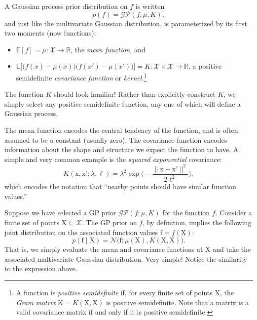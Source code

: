 \documentclass{article}
\newcommand{\given}{\mid}
\newcommand{\mc}[1]{\mathcal{#1}}
\newcommand{\mat}[1]{\bm{\mathrm{#1}}}
\renewcommand{\vec}[1]{\bm{\mathrm{#1}}}
\newcommand{\R}{\mathbb{R}}
\newcommand{\Exp}{\mathbb{E}}
\begin{document}
A Gaussian process prior distribution on $f$ is written
\begin{equation*}
  p(f) = \mc{GP}(f; \mu, K),
\end{equation*}
and just like the multivariate Gaussian distribution, is
parameterized by its first two moments (now functions):
\begin{itemize}
\item $\Exp[f] = \mu\colon \mc{X} \to \R$, the \emph{mean function,} and
\item $\Exp\bigl[\bigl(f(x) - \mu(x)\bigr)\bigl(f(x') -
  \mu(x')\bigr)\bigr] = K\colon \mc{X} \times \mc{X} \to \R$, a
  positive semidefinite \emph{covariance function} or
  \emph{kernel.}\footnote{A function is \emph{positive semidefinite}
    if, for every finite set of points $\mat{X}$, the \emph{Gram
      matrix} $\mat{K} = K(\mat{X}, \mat{X})$ is positive
    semidefinite.  Note that a matrix is a valid covariance matrix if
    and only if it is positive semidefinite.}
\end{itemize}
The function $K$ should look familiar!  Rather than explicitly
construct $K$, we simply select any positive semidefinite function,
any one of which will define a Gaussian process.

The mean function encodes the central tendency of the function, and is
often assumed to be a constant (usually zero).  The covariance
function encodes information about the shape and structure we expect
the function to have.  A simple and very common example is the
\emph{squared exponential} covariance:
\begin{equation*}
  K(\vec{x}, \vec{x}'; \lambda, \ell)
  =
  \lambda^2
  \exp\biggl(-\frac{\lVert \vec{x} - \vec{x}' \rVert^2}{2\ell^2}\biggr),
\end{equation*}
which encodes the notation that ``nearby points should have similar
function values.''

Suppose we have selected a GP prior $\mc{GP}(f; \mu, K)$ for the
function $f$.  Consider a finite set of points $\mat{X} \subseteq
\mc{X}$.  The GP prior on $f$, by definition, implies the following
joint distribution on the associated function values $\vec{f} =
f(\mat{X})$:
\begin{equation*}
  p(\vec{f} \given \mat{X})
  =
  \mc{N}(\vec{f}; \mu(\mat{X}), K(\mat{X}, \mat{X})\bigr).
\end{equation*}
That is, we simply evaluate the mean and covariance functions at
$\mat{X}$ and take the associated multivariate Gaussian distribution.
Very simple!  Notice the similarity to the expression above.
\end{document}
